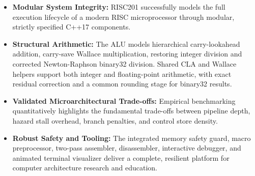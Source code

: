 \documentclass[11pt,a4paper]{article}
\begin{document}
\begin{itemize}
    \item \textbf{Modular System Integrity:} RISC201 successfully models the full execution lifecycle of a modern RISC microprocessor through modular, strictly specified C++17 components.
    \item \textbf{Structural Arithmetic:} The ALU models hierarchical carry-lookahead addition, carry-save Wallace multiplication, restoring integer division and corrected Newton-Raphson binary32 division. Shared CLA and Wallace helpers support both integer and floating-point arithmetic, with exact residual correction and a common rounding stage for binary32 results.
    \item \textbf{Validated Microarchitectural Trade-offs:} Empirical benchmarking quantitatively highlights the fundamental trade-offs between pipeline depth, hazard stall overhead, branch penalties, and control store density.
    \item \textbf{Robust Safety and Tooling:} The integrated memory safety guard, macro preprocessor, two-pass assembler, disassembler, interactive debugger, and animated terminal visualizer deliver a complete, resilient platform for computer architecture research and education.
\end{itemize}
\end{document}
